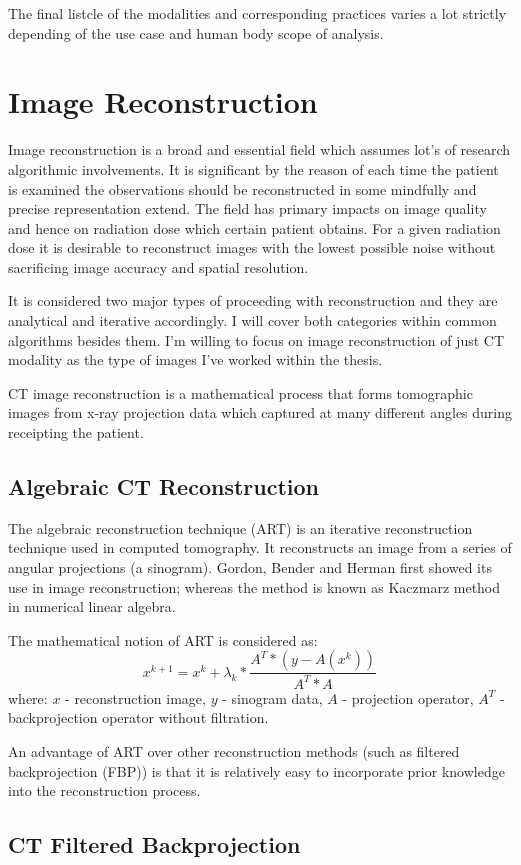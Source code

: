 The final listcle of the modalities and corresponding practices varies a lot strictly depending of the use case and human body scope of analysis.

\section{Image Reconstruction}
Image reconstruction is a broad and essential field which assumes lot's of research algorithmic involvements. It is significant by the reason of each time the patient is examined the observations should be reconstructed in some mindfully and precise representation extend.    
The field has primary impacts on image quality and hence on radiation dose which certain patient obtains. For a given radiation dose it is desirable to reconstruct images with the lowest possible noise without sacrificing image accuracy and spatial resolution.

It is considered two major types of proceeding with reconstruction and they are analytical and iterative accordingly. I will cover both categories within common algorithms besides them. I'm willing to focus on image reconstruction of just CT modality as the type of images I've worked within the thesis.

CT image reconstruction is a mathematical process that forms tomographic images from x-ray projection data which captured at many different angles during receipting the patient. 

\subsection{Algebraic CT Reconstruction}
The algebraic reconstruction technique (ART) is an iterative reconstruction technique used in computed tomography. It reconstructs an image from a series of angular projections (a sinogram). Gordon, Bender and Herman first showed its use in image reconstruction; whereas the method is known as Kaczmarz method in numerical linear algebra.

The mathematical notion of ART is considered as: \[x^{k+1} = x^k + \lambda_k * \dfrac{A^T*(y-A(x^k))}{A^T*A} \] where: $x$ - reconstruction image, $y$ - sinogram data, $A$ - projection operator, $A^T$ - backprojection operator without filtration.

An advantage of ART over other reconstruction methods (such as filtered backprojection (FBP)) is that it is relatively easy to incorporate prior knowledge into the reconstruction process.


\subsection{CT Filtered Backprojection}

